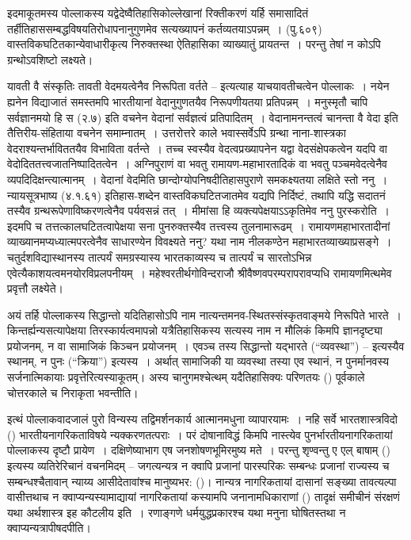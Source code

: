 इदमाकूतमस्य पोल्लाकस्य यद्वेदेष्वैतिहासिकोल्लेखानां रिक्तीकरणं यर्हि समासादितं तर्हीतिहाससम्बद्धविषयतिरोधापनानुगुणमेव सत्यख्यापनं कर्तव्यतयाऽपन्नम्~। (पु.६०९) वास्तविकघटितकान्येवाधारीकृत्य निरुक्तस्था ऐतिहासिका व्याख्यातुं प्रायतन्त~। परन्तु तेषां न कोऽपि ग्रन्थोऽवशिष्टो लक्ष्यते।

यावती वै संस्कृतिः तावती वेदमयत्वेनैव निरूपिता वर्तते – इत्यत्याह याचयावतीचत्वेन पोल्लाकः~। नयेन ह्यनेन विद्याजातं समस्तमपि भारतीयानां वेदानुगुणतयैव निरूपणीयतया प्रतिपन्नम्~। मनुस्मृतौ चापि सर्वज्ञानमयो हि स (२.७) इति वचनेन वेदानां सर्वज्ञत्वं प्रतिपादितम्~। वेदानामनन्तत्वं चानन्ता वै वेदा इति तैत्तिरीय-संहिताया वचनेन समाम्नातम्~। उत्तरोत्तरे काले भवास्सर्वेऽपि ग्रन्था नाना-शास्त्रका वेदराश्यन्तर्भाविततयैव विभाविता वर्तन्ते~। तच्च स्वस्यैव वेदत्वप्रख्यापनेन यद्वा वेदसंक्षेपकत्वेन यदपि वा वेदोदिततत्त्वजातनिष्पादितत्वेन~। अग्निपुराणं वा भवतु रामायण-महाभारतादिकं वा भवतु पञ्चमवेदत्वेनैव व्यपदिदिक्षन्त्यात्मानम्~। वेदानां वेदमिति छान्दोग्योपनिषदीतिहासपुराणे समकक्ष्यतया लक्षिते स्तो ननु~। न्यायसूत्रभाष्य (४.१.६१) इतिहास-शब्देन वास्तविकघटितजातमेव यद्यपि निर्दिष्टं, तथापि यद्धि सदातनं तस्यैव ग्रन्थरूपेणाविष्करणत्वेनैव पर्यवसन्नं तत्~। मीमांसा हि व्यक्त्यपेक्षयाऽऽकृतिमेव ननु पुरस्करोति~। इदमपि च तत्तत्कालघटितत्वापेक्षया सना पुनरुक्तस्यैव तत्त्वस्य तुलनामारूढम्~। रामायणमहाभारतादीनां व्याख्यानमप्यध्यात्मपरत्वेनैव साधारण्येन विवक्ष्यते ननु? यथा नाम नीलकण्ठेन महाभारतव्याख्याप्रसङ्गे~। चतुर्दशविद्यास्थानस्य तात्पर्यं समग्रस्यास्य भारतकाव्यस्य च तात्पर्यं च सारतोऽभिन्न एवेत्यैकाशयत्वमनयोरविप्रलपनीयम्~। महेश्वरतीर्थगोविन्दराजौ श्रीवैष्णवपरम्परापरावप्यधि रामायणमित्थमेव प्रवृत्तौ लक्ष्येते।

अयं तर्हि पोल्लाकस्य सिद्धान्तो यदितिहासोऽपि नाम नात्यन्तमनव-स्थितस्संस्कृतवाङ्मये निरूपिते भारते~। किन्तर्ह्यन्यसत्यापेक्षया तिरस्कार्यत्वमापन्नो यत्रैतिहासिकस्य सत्यस्य नाम न मौलिकं किमपि ज्ञानदृष्ट्या प्रयोजनम्, न वा सामाजिकं किञ्चन प्रयोजनम्~। एवञ्च तस्य सिद्धान्तो यद्भारते  (“व्यवस्था”) – इत्यस्यैव स्थानम्, न पुनः  (“क्रिया”) इत्यस्य~। अर्थात् सामाजिकी या व्यवस्था तस्या एव स्थानं, न पुनर्मानवस्य सर्जनात्मिकायाः प्रवृत्तेरित्यस्याकूतम्। अस्य चानुगमश्चेत्थम् यदैतिहासिक्यः परिणतयः () पूर्वकाले चोत्तरकाले च निराकृता भवन्तीति।

इत्थं पोल्लाकवादजालं पुरो विन्यस्य तद्विमर्शनकार्य आत्मानमधुना व्यापारयामः~। नहि सर्वे भारतशास्त्रविदो () भारतीयनागरिकताविषये न्यक्करणतत्पराः~। परं दोषानाविद्धं किमपि नास्त्येव पुनर्भारतीयनागरिकतायां पोल्लाकस्य दृष्टौ प्रायेण~। दक्षिणेष्याभाग एष जनशोषणभूमिरमुष्य मते~। परन्तु शृण्वन्तु ए एल् बाषाम् () इत्यस्य व्यतिरेरिचानं वचनमिदम् – जगत्यन्यत्र न क्वापि प्रजानां पारस्परिकः सम्बन्धः प्रजानां राज्यस्य च सम्बन्धश्चैतावान् न्याय्य आसीदेतावांश्च मानुष्यभर: ()। नान्यत्र नागरिकतायां दासानां सङ्ख्या तावत्यल्पा वासीत्तथाच न क्वाप्यन्यस्यामाद्यायां नागरिकतायां कस्यामपि जनानामधिकाराणां () तादृक्षं समीचीनं संरक्षणं यथा अर्थशास्त्र इह कौटलीय इति~। रणाङ्गणे धर्मयुद्धप्रकारश्च यथा मनुना घोषितस्तथा न क्वाप्यन्यत्रापीषदपीति।

